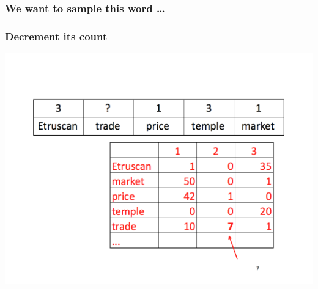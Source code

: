 \begin{frame}
  \frametitle{We want to sample this word \dots}
\end{frame}

\begin{frame}
  \frametitle{Decrement its count}
    \includegraphics[width=\linewidth]{topic_models/mimno_007}
\end{frame}

